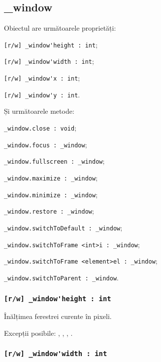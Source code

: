 \subsection{{\color{orange} \_window}}

Obiectul \window{} are următoarele proprietăți:
\begin{icItems}
	\item \lstinline|[r/w] _window'height : int|;
	\item \lstinline|[r/w] _window'width : int|;
	\item \lstinline|[r/w] _window'x : int|;
	\item \lstinline|[r/w] _window'y : int|.
\end{icItems}

Și următoarele metode:
\begin{icItems}
	\item \lstinline|_window.close : void|;
	\item \lstinline|_window.focus : _window|;
	\item \lstinline|_window.fullscreen : _window|;
	\item \lstinline|_window.maximize : _window|;
	\item \lstinline|_window.minimize : _window|;
	\item \lstinline|_window.restore : _window|;
	\item \lstinline|_window.switchToDefault : _window|;
	\item \lstinline|_window.switchToFrame <int>i : _window|;
	\item \lstinline|_window.switchToFrame <element>el : _window|;
	\item \lstinline|_window.switchToParent : _window|.
\end{icItems}

\subsubsection{\lstinline|[r/w] _window'height : int|}

Înălțimea ferestrei curente în pixeli.

Excepții posibile: , , , .

\subsubsection{\lstinline|[r/w] _window'width : int|}


